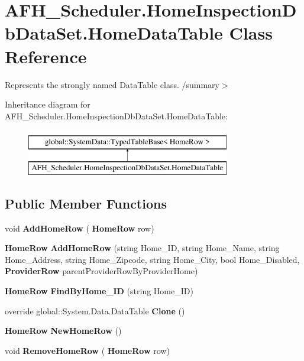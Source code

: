 \section{A\+F\+H\+\_\+\+Scheduler.\+Home\+Inspection\+Db\+Data\+Set.\+Home\+Data\+Table Class Reference}
\label{class_a_f_h___scheduler_1_1_home_inspection_db_data_set_1_1_home_data_table}


Represents the strongly named Data\+Table class. /summary$>$  


Inheritance diagram for A\+F\+H\+\_\+\+Scheduler.\+Home\+Inspection\+Db\+Data\+Set.\+Home\+Data\+Table\+:\begin{figure}[H]
\begin{center}
\leavevmode
\includegraphics[height=2.000000cm]{class_a_f_h___scheduler_1_1_home_inspection_db_data_set_1_1_home_data_table}
\end{center}
\end{figure}
\subsection*{Public Member Functions}
\begin{DoxyCompactItemize}
\item 
\mbox{\label{class_a_f_h___scheduler_1_1_home_inspection_db_data_set_1_1_home_data_table_a2c8e95e6e52ff82ba9f1e79e6acc6146}} 
void {\bfseries Add\+Home\+Row} (\textbf{ Home\+Row} row)
\item 
\mbox{\label{class_a_f_h___scheduler_1_1_home_inspection_db_data_set_1_1_home_data_table_a9b6492c5bbdbf911e8720e7bbff112b1}} 
\textbf{ Home\+Row} {\bfseries Add\+Home\+Row} (string Home\+\_\+\+ID, string Home\+\_\+\+Name, string Home\+\_\+\+Address, string Home\+\_\+\+Zipcode, string Home\+\_\+\+City, bool Home\+\_\+\+Disabled, \textbf{ Provider\+Row} parent\+Provider\+Row\+By\+Provider\+Home)
\item 
\mbox{\label{class_a_f_h___scheduler_1_1_home_inspection_db_data_set_1_1_home_data_table_a4a679383c2fea189871d1baed3d83240}} 
\textbf{ Home\+Row} {\bfseries Find\+By\+Home\+\_\+\+ID} (string Home\+\_\+\+ID)
\item 
\mbox{\label{class_a_f_h___scheduler_1_1_home_inspection_db_data_set_1_1_home_data_table_a91aa7e300730c05585f5bac68022a00c}} 
override global\+::\+System.\+Data.\+Data\+Table {\bfseries Clone} ()
\item 
\mbox{\label{class_a_f_h___scheduler_1_1_home_inspection_db_data_set_1_1_home_data_table_a5ed6cfd9ccd87be055200aa632862fda}} 
\textbf{ Home\+Row} {\bfseries New\+Home\+Row} ()
\item 
\mbox{\label{class_a_f_h___scheduler_1_1_home_inspection_db_data_set_1_1_home_data_table_a8810663142756e9077cf1b1b0981c82f}} 
void {\bfseries Remove\+Home\+Row} (\textbf{ Home\+Row} row)
\end{DoxyCompactItemize}
